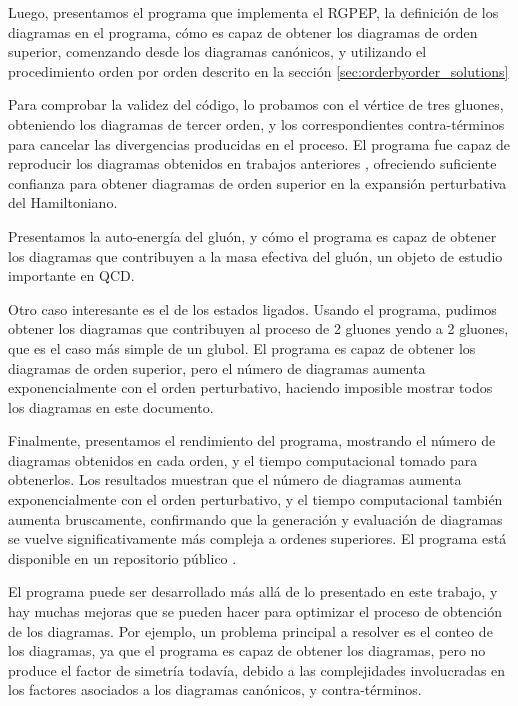 \documentclass[11pt,a4paper,twoside,pdf]{article}
\numberwithin{equation}{section}
\begin{document}
Luego, presentamos el programa que implementa el RGPEP, la definici\'on de los diagramas
en el programa, c\'omo es capaz de obtener los diagramas de orden superior, comenzando
desde los diagramas can\'onicos, y utilizando el procedimiento orden por orden descrito en la secci\'on
\ref{sec:orderbyorder_solutions}

Para comprobar la validez del c\'odigo, lo probamos con el v\'ertice de tres gluones,
obteniendo los diagramas de tercer orden, y los correspondientes contra-t\'erminos para cancelar
las divergencias producidas en el proceso. El programa fue capaz de reproducir los
diagramas obtenidos en trabajos anteriores \cite{QCDG}, ofreciendo suficiente confianza para obtener diagramas de
orden superior en la expansi\'on perturbativa del Hamiltoniano.

Presentamos la auto-energ\'ia del glu\'on, y c\'omo el programa es capaz de
obtener los diagramas que contribuyen a la masa efectiva
del glu\'on, un objeto de estudio importante en QCD.

Otro caso interesante es el de los estados ligados.
Usando el programa, pudimos obtener los diagramas que contribuyen al proceso
de 2 gluones yendo a 2 gluones, que es el caso m\'as simple de un glubol.
El programa es capaz de obtener los diagramas de orden superior, pero el n\'umero de
diagramas aumenta exponencialmente con el orden perturbativo, haciendo imposible
mostrar todos los diagramas en este documento.

Finalmente, presentamos el rendimiento del programa, mostrando el n\'umero de diagramas
obtenidos en cada orden, y el tiempo computacional tomado para obtenerlos. Los resultados
muestran que el n\'umero de diagramas aumenta exponencialmente con el orden perturbativo,
y el tiempo computacional tambi\'en aumenta bruscamente, confirmando que la generaci\'on
y evaluaci\'on de diagramas se vuelve significativamente m\'as compleja a ordenes superiores.
El programa est\'a disponible en un repositorio p\'ublico \cite{Liu_Computational_tools_for_2025}.

El programa puede ser desarrollado m\'as all\'a de lo presentado en este trabajo, y hay muchas mejoras que se pueden
hacer para optimizar el proceso de obtenci\'on de los diagramas. Por ejemplo, un problema principal a
resolver es el conteo de los diagramas, ya que el programa es capaz de obtener los diagramas,
pero no produce el factor de simetr\'ia todav\'ia, debido a las complejidades involucradas en los factores
asociados a los diagramas can\'onicos, y contra-t\'erminos.
\end{document}
